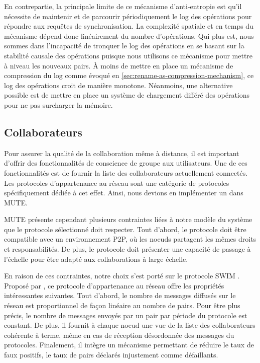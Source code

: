 En contrepartie, la principale limite de ce mécanisme d'anti-entropie est qu'il nécessite de maintenir et de parcourir périodiquement le log des opérations pour répondre aux requêtes de synchronisation.
La complexité spatiale et en temps du mécanisme dépend donc linéairement du nombre d'opérations.
Qui plus est, nous sommes dans l'incapacité de tronquer le log des opérations en se basant sur la stabilité causale des opérations puisque nous utilisons ce mécanisme pour mettre à niveau les nouveaux pairs.
À moins de mettre en place un mécanisme de compression du log comme évoqué en \autoref{sec:rename-as-compression-mechanism}, ce log des opérations croit de manière monotone.
Néanmoins, une alternative possible est de mettre en place un système de chargement différé des opérations pour ne pas surcharger la mémoire.

\subsection{Collaborateurs}

Pour assurer la qualité de la collaboration même à distance, il est important d'offrir des fonctionnalités de conscience de groupe aux utilisateurs.
Une de ces fonctionnalités est de fournir la liste des collaborateurs actuellement connectés.
Les protocoles d'appartenance au réseau sont une catégorie de protocoles spécifiquement dédiée à cet effet.
Ainsi, nous devions en implémenter un dans MUTE.

MUTE présente cependant plusieurs contraintes liées à notre modèle du système que le protocole sélectionné doit respecter.
Tout d'abord, le protocole doit être compatible avec un environnement \ac{P2P}, où les noeuds partagent les mêmes droits et responsabilités.
De plus, le protocole doit présenter une capacité de passage à l'échelle pour être adapté aux collaborations à large échelle.

En raison de ces contraintes, notre choix s'est porté sur le protocole SWIM \cite{swim2002}.
Proposé par \citeauthor{swim2002}, ce protocole d'appartenance au réseau offre les propriétés intéressantes suivantes.
Tout d'abord, le nombre de messages diffusés sur le réseau est proportionnel de façon linéaire au nombre de pairs.
Pour être plus précis, le nombre de messages envoyés par un pair par période du protocole est constant.
De plus, il fournit à chaque noeud une vue de la liste des collaborateurs cohérente à terme, même en cas de réception désordonnée des messages du protocoles.
Finalement, il intègre un mécanisme permettant de réduire le taux de faux positifs, \ie le taux de pairs déclarés injustement comme défaillants.

